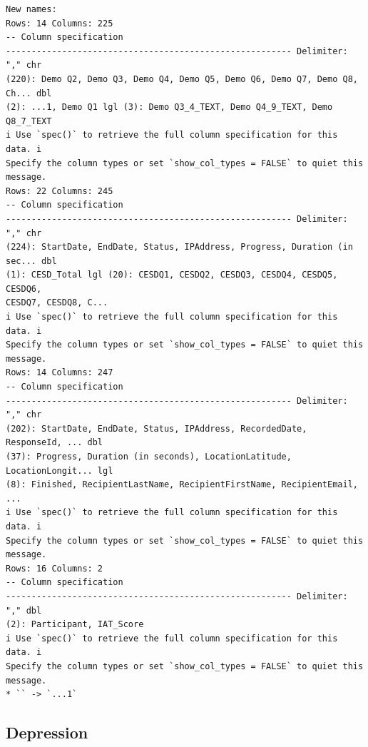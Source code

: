 \documentclass[
]{article}
\begin{document}
\begin{verbatim}
New names:
Rows: 14 Columns: 225
-- Column specification
-------------------------------------------------------- Delimiter: "," chr
(220): Demo Q2, Demo Q3, Demo Q4, Demo Q5, Demo Q6, Demo Q7, Demo Q8, Ch... dbl
(2): ...1, Demo Q1 lgl (3): Demo Q3_4_TEXT, Demo Q4_9_TEXT, Demo Q8_7_TEXT
i Use `spec()` to retrieve the full column specification for this data. i
Specify the column types or set `show_col_types = FALSE` to quiet this message.
Rows: 22 Columns: 245
-- Column specification
-------------------------------------------------------- Delimiter: "," chr
(224): StartDate, EndDate, Status, IPAddress, Progress, Duration (in sec... dbl
(1): CESD_Total lgl (20): CESDQ1, CESDQ2, CESDQ3, CESDQ4, CESDQ5, CESDQ6,
CESDQ7, CESDQ8, C...
i Use `spec()` to retrieve the full column specification for this data. i
Specify the column types or set `show_col_types = FALSE` to quiet this message.
Rows: 14 Columns: 247
-- Column specification
-------------------------------------------------------- Delimiter: "," chr
(202): StartDate, EndDate, Status, IPAddress, RecordedDate, ResponseId, ... dbl
(37): Progress, Duration (in seconds), LocationLatitude, LocationLongit... lgl
(8): Finished, RecipientLastName, RecipientFirstName, RecipientEmail, ...
i Use `spec()` to retrieve the full column specification for this data. i
Specify the column types or set `show_col_types = FALSE` to quiet this message.
Rows: 16 Columns: 2
-- Column specification
-------------------------------------------------------- Delimiter: "," dbl
(2): Participant, IAT_Score
i Use `spec()` to retrieve the full column specification for this data. i
Specify the column types or set `show_col_types = FALSE` to quiet this message.
* `` -> `...1`
\end{verbatim}

\subsection{Depression}\label{depression}
\end{document}
